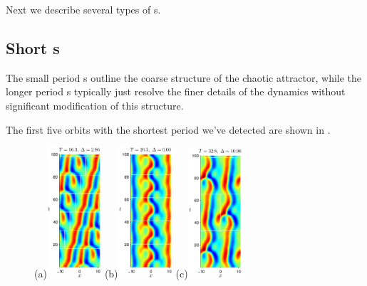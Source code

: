 Next we describe several types of \rpo s.

\subsection{Short \rpo s}  The small period \rpo s outline the
coarse structure of the chaotic attractor, while the longer period
\rpo s typically just resolve the finer details of the dynamics
without significant modification of this structure.

The first five orbits with the shortest period we've detected are
shown in .

\begin{figure}[t] \label{f:ks22rposShort}
\begin{center}
(a)\includegraphics[width=0.18\textwidth]{figs/ks22rpo016.3-02.86.eps}
(b)\includegraphics[width=0.18\textwidth]{figs/ks22rpo020.5-00.00.eps}
(c)\includegraphics[width=0.18\textwidth]{figs/ks22rpo032.8-10.96.eps}

\end{center}
\end{figure}
